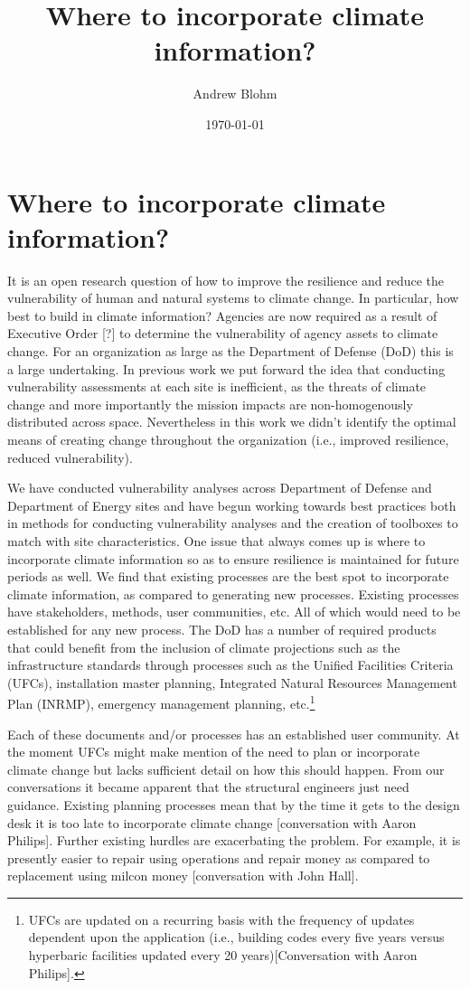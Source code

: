 \documentclass[10pt]{amsart}
\title{Where to incorporate climate information?}
\author{Andrew Blohm}
\date{\today}
\begin{document}
\maketitle
\section{Where to incorporate climate information?}
It is an open research question of how to improve the resilience and reduce the vulnerability of human and natural systems to climate change.
In particular, how best to build in climate information? 
Agencies are now required as a result of Executive Order [?] to determine the vulnerability of agency assets to climate change.
For an organization as large as the Department of Defense (DoD) this is a large undertaking. 
In previous work we put forward the idea that conducting vulnerability assessments at each site is inefficient, as the threats of climate change and more importantly the mission impacts are non-homogenously distributed across space.
Nevertheless in this work we didn't identify the optimal means of creating change throughout the organization (i.e., improved resilience, reduced vulnerability).

We have conducted vulnerability analyses across Department of Defense and Department of Energy sites and have begun working towards best practices both in methods for conducting vulnerability analyses and the creation of toolboxes to match with site characteristics.
One issue that always comes up is where to incorporate climate information so as to ensure resilience is maintained for future periods as well.
We find that existing processes are the best spot to incorporate climate information, as compared to generating new processes. 
Existing processes have stakeholders, methods, user communities, etc.
All of which would need to be established for any new process.
The DoD has a number of required products that could benefit from the inclusion of climate projections such as the infrastructure standards through processes such as the Unified Facilities Criteria (UFCs), installation master planning, Integrated Natural Resources Management Plan (INRMP), emergency management planning, etc.\footnote{UFCs are updated on a recurring basis with the frequency of updates dependent upon the application (i.e., building codes every five years versus hyperbaric facilities updated every 20 years)[Conversation with Aaron Philips].}

Each of these documents and/or processes has an established user community.
At the moment UFCs might make mention of the need to plan or incorporate climate change but lacks sufficient detail on how this should happen.
From our conversations it became apparent that the structural engineers just need guidance. 
Existing planning processes mean that by the time it gets to the design desk it is too late to incorporate climate change \parencite{}[conversation with Aaron Philips].
Further existing hurdles are exacerbating the problem.
For example, it is presently easier to repair using operations and repair money as compared to replacement using milcon money \parencite{}[conversation with John Hall].
\end{document}
